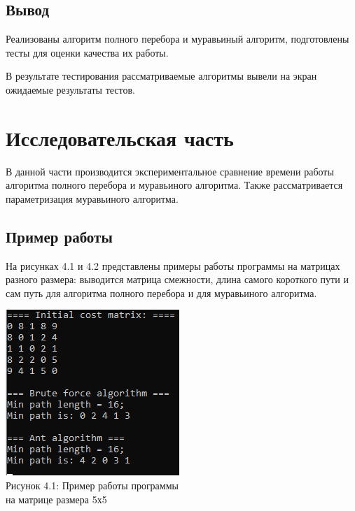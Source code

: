 \documentclass[12pt]{report}
\begin{document}
\section{Вывод}
Реализованы алгоритм полного перебора и муравьиный алгоритм, подготовлены тесты для оценки качества их работы.

В результате тестирования рассматриваемые алгоритмы вывели на экран ожидаемые результаты тестов. 

\chapter{Исследовательская часть}

 В данной части производится экспериментальное сравнение времени работы алгоритма полного перебора и муравьиного алгоритма. Также рассматривается параметризация муравьиного алгоритма.

\section{Пример работы}

	На рисунках 4.1 и 4.2 представлены примеры работы программы на матрицах разного размера: выводится матрица смежности, длина самого короткого пути и сам путь для алгоритма полного перебора и для муравьиного алгоритма.
\begin{center}
	\label{img:prim} 
	\includegraphics[scale = 1]{primer1} \\ Рисунок 4.1: Пример работы программы\\ на матрице размера 5х5
\end{center}	
\end{document}
